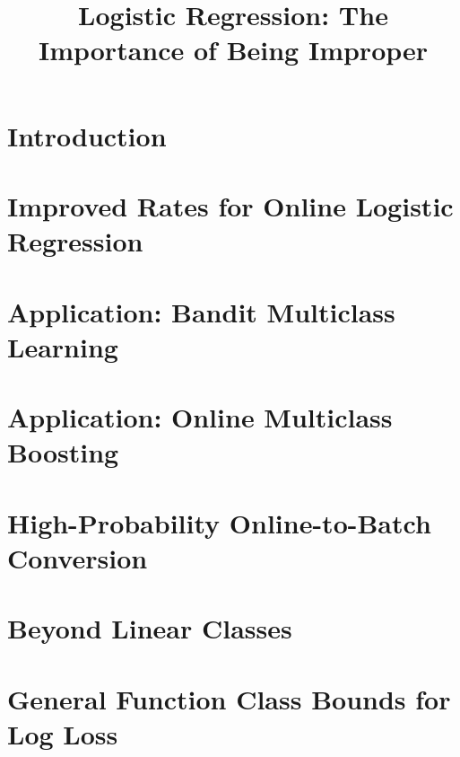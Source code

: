 \documentclass[final,12pt]{colt2018}
\title[Logistic Regression: The Importance of Being Improper]{Logistic Regression: The Importance of Being Improper}
\date{}
\begin{document}
\maketitle

\begin{abstract}
  
\end{abstract}


\section{Introduction}
\label{sec:introduction}



\section{Improved Rates for Online Logistic Regression}
\label{sec:logistic}


\section{Application: Bandit Multiclass Learning}
\label{sec:bandit_multiclass}


\section{Application: Online Multiclass Boosting}
\label{sec:online_boosting}



\section{High-Probability Online-to-Batch Conversion}
\label{sec:online_to_batch}



\section{Beyond Linear Classes}
\label{sec:general_class}



\section{General Function Class Bounds for Log Loss}
\label{sec:log_loss}



\end{document}
